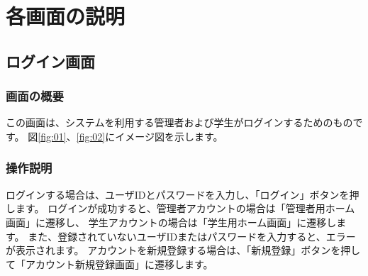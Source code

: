 \section{各画面の説明}
\subsection{ログイン画面}
\subsubsection{画面の概要}
この画面は、システムを利用する管理者および学生がログインするためのものです。
図\ref{fig:01}、\ref{fig:02}にイメージ図を示します。

\subsubsection{操作説明}
ログインする場合は、ユーザIDとパスワードを入力し、「ログイン」ボタンを押します。
ログインが成功すると、管理者アカウントの場合は「管理者用ホーム画面」に遷移し、
学生アカウントの場合は「学生用ホーム画面」に遷移します。
また、登録されていないユーザIDまたはパスワードを入力すると、エラーが表示されます。
アカウントを新規登録する場合は、「新規登録」ボタンを押して「アカウント新規登録画面」に遷移します。

\newpage




